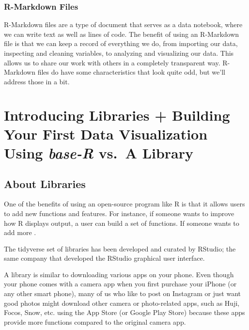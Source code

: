 \documentclass[
]{book}
\begin{document}
\hypertarget{r-markdown-files}{%
\subsection{R-Markdown Files}\label{r-markdown-files}}

R-Markdown files are a type of document that serves as a data notebook, where we can write text as well as lines of code. The benefit of using an R-Markdown file is that we can keep a record of everything we do, from importing our data, inspecting and cleaning variables, to analyzing and visualizing our data. This allows us to share our work with others in a completely transparent way. R-Markdown files do have some characteristics that look quite odd, but we'll address those in a bit.

\hypertarget{introducing-libraries-building-your-first-data-visualization-using-base-r-vs.-a-library}{%
\chapter{\texorpdfstring{Introducing Libraries + Building Your First Data Visualization Using \emph{base-R} vs.~A Library}{Introducing Libraries + Building Your First Data Visualization Using base-R vs.~A Library}}\label{introducing-libraries-building-your-first-data-visualization-using-base-r-vs.-a-library}}

\hypertarget{about-libraries}{%
\section{About Libraries}\label{about-libraries}}

One of the benefits of using an open-source program like R is that it allows users to add new functions and features. For instance, if someone wants to improve how R displays output, a user can build a set of functions. If someone wants to add more .

The tidyverse set of libraries has been developed and curated by RStudio; the same company that developed the RStudio graphical user interface.

A library is similar to downloading various apps on your phone. Even though your phone comes with a camera app when you first purchase your iPhone (or any other smart phone), many of us who like to post on Instagram or just want good photos might download other camera or photo-related apps, such as Huji, Focos, Snow, etc. using the App Store (or Google Play Store) because these apps provide more functions compared to the original camera app.
\end{document}
